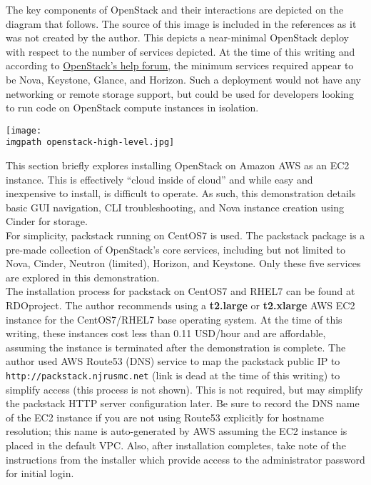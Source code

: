 The key components of OpenStack and their interactions are depicted on the
diagram that follows. The source of this image is included in the references as it
was not created by the author. This depicts a near-minimal OpenStack deploy
with respect to the number of services depicted. At the time of this writing
and according to
\href{https://ask.openstack.org/en/question/63268/installing-minimum-services-using-devstack/}{OpenStack’s help forum},
the minimum services required appear to be Nova, Keystone, Glance, and
Horizon. Such a deployment would not have any networking or remote storage
support, but could be used for developers looking to run code on OpenStack
compute instances in isolation.

    \begin{minipage}[t]{\linewidth}
	  \centering
      \texttt{[image: \\imgpath openstack-high-level.jpg]}
    \end{minipage}

This section briefly explores installing OpenStack on Amazon AWS as an EC2
instance. This is effectively ``cloud inside of cloud'' and while easy and
inexpensive to install, is difficult to operate. As such, this demonstration
details basic GUI navigation, CLI troubleshooting, and Nova instance creation
using Cinder for storage. \\

For simplicity, packstack running on CentOS7 is used. The packstack package is
a pre-made collection of OpenStack’s core services, including but not limited
to Nova, Cinder, Neutron (limited), Horizon, and Keystone. Only these five
services are explored in this demonstration. \\

The installation process for packstack on CentOS7 and RHEL7 can be found at
RDOproject. The author recommends using a \textbf{t2.large} or
\textbf{t2.xlarge} AWS EC2 instance for the CentOS7/RHEL7 base operating
system. At the time of this writing, these instances cost less than 0.11
USD/hour and are affordable, assuming the instance is terminated after the
demonstration is complete. The author used AWS Route53 (DNS) service to map
the packstack public IP to \verb|http://packstack.njrusmc.net| (link is dead
at the time of this writing) to simplify access (this process is not shown).
This is not required, but may simplify the packstack HTTP server configuration
later. Be sure to record the DNS name of the EC2 instance if you are not using
Route53 explicitly for hostname resolution; this name is auto-generated by AWS
assuming the EC2 instance is placed in the default VPC. Also, after
installation completes, take note of the instructions from the installer which
provide access to the administrator password for initial login. \\

